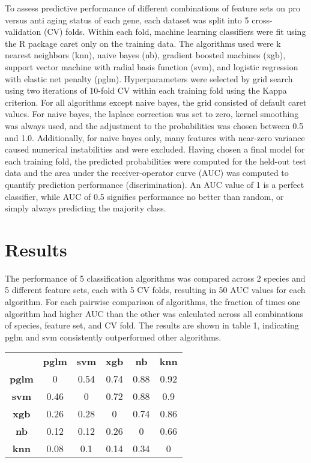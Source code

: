 \documentclass{article}
\begin{document}
To assess predictive performance of different combinations of feature sets on pro versus anti aging status of each gene, each dataset was split into 5 cross-validation (CV) folds. Within each fold, machine learning classifiers were fit using the R package caret only on the training data. The algorithms used were k nearest neighbors (knn), naive bayes (nb), gradient boosted machines (xgb), support vector machine with radial basis function (svm), and logistic regression with elastic net penalty (pglm). Hyperparameters were selected by grid search using two iterations of 10-fold CV within each training fold using the Kappa criterion. For all algorithms except naive bayes, the grid consisted of default caret values. For naive bayes, the laplace correction was set to zero, kernel smoothing was always used, and the adjustment to the probabilities was chosen between 0.5 and 1.0. Additionally, for naive bayes only, many features with near-zero variance caused numerical instabilities and were excluded. Having chosen a final model for each training fold, the predicted probabilities were computed for the held-out test data and the area under the receiver-operator curve (AUC) was computed to quantify prediction performance (discrimination). An AUC value of 1 is a perfect classifier, while AUC of 0.5 signifies performance no better than random, or simply always predicting the majority class.

\section{Results}

The performance of 5 classification algorithms was compared across 2 species and 5 different feature sets, each with 5 CV folds, resulting in 50 AUC values for each algorithm. For each pairwise comparison of algorithms, the fraction of times one algorithm had higher AUC than the other was calculated across all combinations of species, feature set, and CV fold. The results are shown in table 1, indicating pglm and svm consistently outperformed other algorithms.

\begin{table}[]
\begin{tabular}{cccccc}
             & \textbf{pglm} & \textbf{svm} & \textbf{xgb} & \textbf{nb} & \textbf{knn} \\
\textbf{pglm} & 0             & 0.54         & 0.74         & 0.88        & 0.92         \\
\textbf{svm}  & 0.46          & 0            & 0.72         & 0.88        & 0.9          \\
\textbf{xgb}  & 0.26          & 0.28         & 0            & 0.74        & 0.86         \\
\textbf{nb}   & 0.12          & 0.12         & 0.26         & 0           & 0.66         \\
\textbf{knn}  & 0.08          & 0.1          & 0.14         & 0.34        & 0
\end{tabular}
\end{table}
\end{document}
